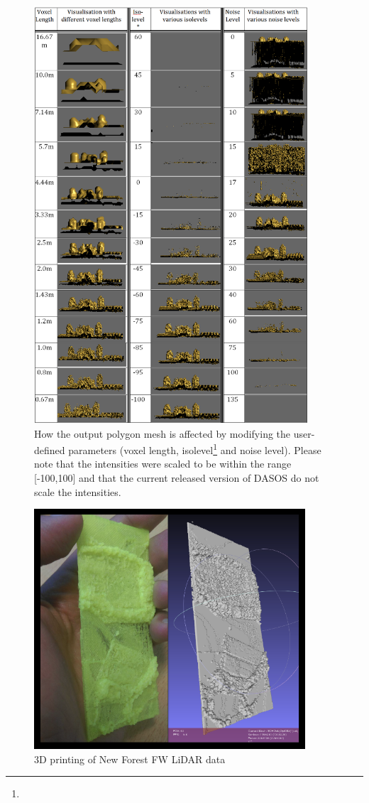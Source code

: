 \documentclass{subfiles}
\begin{document}
  
  \begin{figure} [h!]
  	\centering
  	\includegraphics[width=0.91\textwidth]{img/SwitchingParameters}
  	\caption[Polygonisation Parameters]{How the output polygon mesh is affected by modifying the user-defined parameters (voxel length, isolevel\footnote{} and noise level). Please note that the intensities were scaled to be within the range [-100,100] and that the current released version of DASOS do not scale the intensities.}
  	\label{fig:SwitchingVisParameters}
  \end{figure}
  

  
   \begin{figure} [h!]
   	\centering
   	\includegraphics[width=0.9\textwidth]{img/NF-3Dprint}
   	\caption[3D printing]{3D printing of New Forest FW LiDAR data}
   	\label{fig:3Dprinting}
   \end{figure}

 
\end{document}

